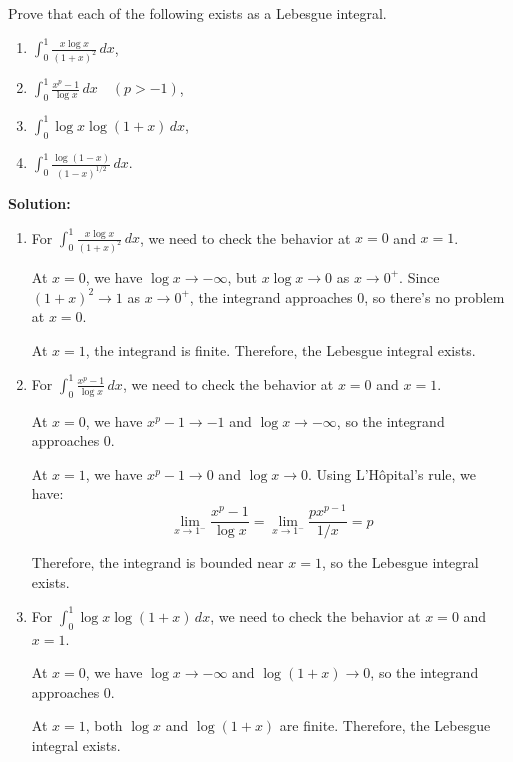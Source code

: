 \begin{problembox}
Prove that each of the following exists as a Lebesgue integral.
\begin{enumerate}[label=(\alph*)]
    \item $\int_{0}^{1} \frac{x \log x}{(1 + x)^2} \, dx$,
    \item $\int_{0}^{1} \frac{x^p - 1}{\log x} \, dx \quad (p > -1)$,
    \item $\int_{0}^{1} \log x \log (1 + x) \, dx$,
    \item $\int_{0}^{1} \frac{\log (1 - x)}{(1 - x)^{1/2}} \, dx.$
\end{enumerate}
\end{problembox}

\noindent\textbf{Solution:}
\begin{enumerate}[label=(\alph*)]
    \item For $\int_{0}^{1} \frac{x \log x}{(1 + x)^2} \, dx$, we need to check the behavior at $x = 0$ and $x = 1$.
    
    At $x = 0$, we have $\log x \to -\infty$, but $x \log x \to 0$ as $x \to 0^+$. Since $(1 + x)^2 \to 1$ as $x \to 0^+$, the integrand approaches 0, so there's no problem at $x = 0$.
    
    At $x = 1$, the integrand is finite. Therefore, the Lebesgue integral exists.
    
    \item For $\int_{0}^{1} \frac{x^p - 1}{\log x} \, dx$, we need to check the behavior at $x = 0$ and $x = 1$.
    
    At $x = 0$, we have $x^p - 1 \to -1$ and $\log x \to -\infty$, so the integrand approaches 0.
    
    At $x = 1$, we have $x^p - 1 \to 0$ and $\log x \to 0$. Using L'Hôpital's rule, we have:
    \[\lim_{x \to 1^-} \frac{x^p - 1}{\log x} = \lim_{x \to 1^-} \frac{px^{p-1}}{1/x} = p\]
    
    Therefore, the integrand is bounded near $x = 1$, so the Lebesgue integral exists.
    
    \item For $\int_{0}^{1} \log x \log (1 + x) \, dx$, we need to check the behavior at $x = 0$ and $x = 1$.
    
    At $x = 0$, we have $\log x \to -\infty$ and $\log (1 + x) \to 0$, so the integrand approaches 0.
    
    At $x = 1$, both $\log x$ and $\log (1 + x)$ are finite. Therefore, the Lebesgue integral exists.
    

\end{enumerate}
